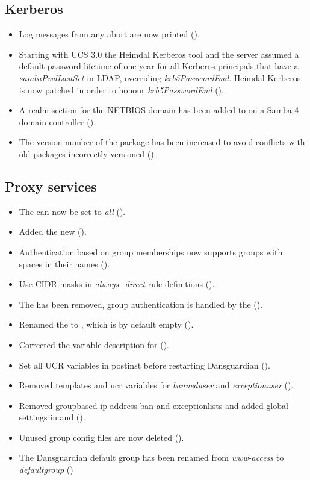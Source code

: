 \subsection{Kerberos}
\begin{itemize}
\item Log messages from any abort are now printed ().
\item Starting with UCS 3.0 the Heimdal Kerberos  tool and the
  server assumed a default password lifetime of one year for all
  Kerberos principals that have a \emph{sambaPwdLastSet} in LDAP, overriding
  \emph{krb5PasswordEnd}. Heimdal Kerberos is now patched in order to honour
  \emph{krb5PasswordEnd} ().
\item A realm section for the NETBIOS domain has been added to
   on a Samba 4 domain controller ().
\item The version number of the package
   has been increased to avoid
  conflicts with old packages incorrectly versioned ().
\end{itemize}

\subsection{Proxy services}
\begin{itemize}
\item The  can now be set to \emph{all} ().
\item Added the new  ().
\item Authentication based on group memberships now supports groups with
  spaces in their names ().
\item Use CIDR masks in \emph{always\_direct} rule definitions
  ().
\item The  has been removed, group
  authentication is handled by the 
  ().
\item Renamed the  to
  , which is by default empty
  ().
\item Corrected the \ucsUCR{} variable description for
   ().
\item Set all UCR variables in postinst before restarting Dansguardian ().
\item Removed templates and ucr variables for \emph{banneduser} and
  \emph{exceptionuser} ().
\item Removed groupbased ip address ban and exceptionlists and added global settings in
   and
   ().
\item Unused group config files are now deleted ().
\item The Dansguardian default group has been renamed from
  \emph{www-access} to \emph{defaultgroup} ()
\end{itemize}

